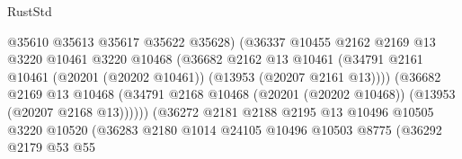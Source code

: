 \begin{lexlean}{RustStd}
\begin{coremodule}
                                          @35610
                                          @35613
                                          @35617
                                          @35622
                                          @35628)
                                        (@36337
                                          @10455
                                          @2162
                                          @2169
                                          @13
                                          @3220
                                          @10461
                                          @3220
                                          @10468
                                          (@36682
                                            @2162
                                            @13
                                            @10461
                                            (@34791
                                              @2161
                                              @10461
                                              (@20201 (@20202 @10461))
                                              (@13953 (@20207 @2161 @13))))
                                          (@36682
                                            @2169
                                            @13
                                            @10468
                                            (@34791
                                              @2168
                                              @10468
                                              (@20201 (@20202 @10468))
                                              (@13953 (@20207 @2168 @13))))))
                                      (@36272
                                        @2181
                                        @2188
                                        @2195
                                        @13
                                        @10496
                                        @10505
                                        @3220
                                        @10520
                                        (@36283
                                          @2180
                                          @1014
                                          @24105
                                          @10496
                                          @10503
                                          @8775
                                          (@36292
                                            @2179
                                            @53
                                            @55

\end{coremodule}
\end{lexlean}
